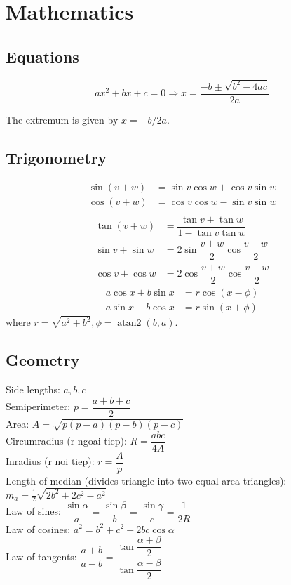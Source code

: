 
\chapter{Mathematics}

\section{Equations}
\[ax^2+bx+c=0 \Rightarrow x = \frac{-b\pm\sqrt{b^2-4ac}}{2a}\]

The extremum is given by $x = -b/2a$.

\section{Trigonometry}
\begin{align*}
\sin(v+w)&{}=\sin v\cos w+\cos v\sin w\\
\cos(v+w)&{}=\cos v\cos w-\sin v\sin w\\
\end{align*}
\begin{align*}
\tan(v+w)&{}=\dfrac{\tan v+\tan w}{1-\tan v\tan w}\\
\sin v+\sin w&{}=2\sin\dfrac{v+w}{2}\cos\dfrac{v-w}{2}\\
\cos v+\cos w&{}=2\cos\dfrac{v+w}{2}\cos\dfrac{v-w}{2}
\end{align*}
\begin{align*}
a\cos x+b\sin x&=r\cos(x-\phi)\\
a\sin x+b\cos x&=r\sin(x+\phi)
\end{align*}
where $r=\sqrt{a^2+b^2}, \phi=\operatorname{atan2}(b,a)$.

\section{Geometry}
Side lengths: $a,b,c$\\
Semiperimeter: $p=\dfrac{a+b+c}{2}$\\
Area: $A=\sqrt{p(p-a)(p-b)(p-c)}$\\
Circumradius (r ngoai tiep): $R=\dfrac{abc}{4A}$\\
Inradius (r noi tiep): $r=\dfrac{A}{p}$\\
Length of median (divides triangle into two equal-area triangles): $m_a=\tfrac{1}{2}\sqrt{2b^2+2c^2-a^2}$\\
Law of sines: $\dfrac{\sin\alpha}{a}=\dfrac{\sin\beta}{b}=\dfrac{\sin\gamma}{c}=\dfrac{1}{2R}$\\
Law of cosines: $a^2=b^2+c^2-2bc\cos\alpha$\\
Law of tangents: $\dfrac{a+b}{a-b}=\dfrac{\tan\dfrac{\alpha+\beta}{2}}{\tan\dfrac{\alpha-\beta}{2}}$\\

